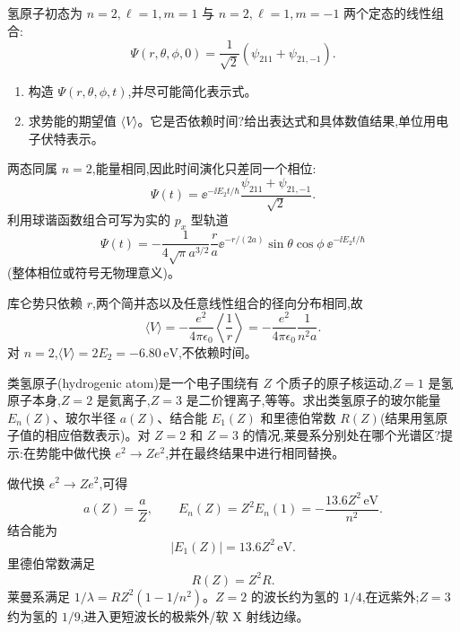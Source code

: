 \begin{question}
氢原子初态为 $n=2,\ell=1,m=1$ 与 $n=2,\ell=1,m=-1$ 两个定态的线性组合:
\[
\Psi(r,\theta,\phi,0)=\frac{1}{\sqrt2}\left(\psi_{211}+\psi_{21,-1}\right).
\]
\begin{enumerate}
\item 构造 $\Psi(r,\theta,\phi,t)$,并尽可能简化表示式。
\item 求势能的期望值 $\langle V\rangle$。它是否依赖时间?给出表达式和具体数值结果,单位用电子伏特表示。
\end{enumerate}
\begin{solution}

两态同属 $n=2$,能量相同,因此时间演化只差同一个相位:
\[
\Psi(t)=\ee^{-\ii E_2t/\hbar}\frac{\psi_{211}+\psi_{21,-1}}{\sqrt2}.
\]
利用球谐函数组合可写为实的 $p_x$ 型轨道
\[
\Psi(t)=-\frac{1}{4\sqrt{\pi}a^{3/2}}\frac{r}{a}\ee^{-r/(2a)}\sin\theta\cos\phi\ \ee^{-\ii E_2t/\hbar}
\]
(整体相位或符号无物理意义)。

库仑势只依赖 $r$,两个简并态以及任意线性组合的径向分布相同,故
\[
\langle V\rangle=-\frac{e^2}{4\pi\epsilon_0}\left\langle\frac1r\right\rangle
=-\frac{e^2}{4\pi\epsilon_0}\frac{1}{n^2a}.
\]
对 $n=2$,$\langle V\rangle=2E_2=-6.80\,\mathrm{eV}$,不依赖时间。

\end{solution}
\end{question}

\begin{question}
类氢原子(hydrogenic atom)是一个电子围绕有 $Z$ 个质子的原子核运动,$Z=1$ 是氢原子本身,$Z=2$ 是氦离子,$Z=3$ 是二价锂离子,等等。求出类氢原子的玻尔能量 $E_n(Z)$、玻尔半径 $a(Z)$、结合能 $E_1(Z)$ 和里德伯常数 $R(Z)$(结果用氢原子值的相应倍数表示)。对 $Z=2$ 和 $Z=3$ 的情况,莱曼系分别处在哪个光谱区?提示:在势能中做代换 $e^2\to Ze^2$,并在最终结果中进行相同替换。
\begin{solution}

做代换 $e^2\to Ze^2$,可得
\[
a(Z)=\frac{a}{Z},\qquad E_n(Z)=Z^2E_n(1)=-\frac{13.6Z^2\,\mathrm{eV}}{n^2}.
\]
结合能为
\[
|E_1(Z)|=13.6Z^2\,\mathrm{eV}.
\]
里德伯常数满足
\[
R(Z)=Z^2R.
\]
莱曼系满足 $1/\lambda=RZ^2(1-1/n^2)$。$Z=2$ 的波长约为氢的 $1/4$,在远紫外;$Z=3$ 约为氢的 $1/9$,进入更短波长的极紫外/软 X 射线边缘。

\end{solution}
\end{question}

